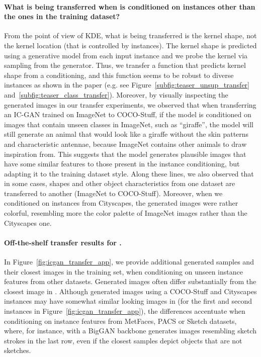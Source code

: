 \paragraph{What is being transferred when \ours is conditioned on instances other than the ones in the training dataset?} From the point of view of KDE, what is being transferred is the kernel shape, not the kernel location (that is controlled by instances). The kernel shape is predicted using a generative model from each input instance and we probe the kernel via sampling from the generator. Thus, we transfer a function that predicts kernel shape from a conditioning, and this function seems to be robust to diverse instances as shown in the paper (e.g. see Figure~\ref{subfig:teaser_unsup_transfer} and~\ref{subfig:teaser_class_transfer}). 
Moreover, by visually inspecting the generated images in our transfer experiments, we observed that when transferring an IC-GAN trained on ImageNet to COCO-Stuff, if the model is conditioned on images that contain unseen classes in ImageNet, such as “giraffe”, the model will still generate an animal that would look like a giraffe without the skin patterns and characteristic antennae, because ImageNet contains other animals to draw inspiration from. This suggests that the model generates plausible images that have some similar features to those present in the instance conditioning, but adapting it to the training dataset style. Along these lines, we also observed that in some cases, shapes and other object characteristics from one dataset are transferred to another (ImageNet to COCO-Stuff). Moreover, when we conditioned on instances from Cityscapes, the generated images were rather colorful, resembling more the color palette of ImageNet images rather than the Cityscapes one. 

\paragraph{Off-the-shelf transfer results for \ours.} In Figure~\ref{fig:icgan_transfer_app}, we provide additional generated samples and their closest images in the \ImNet training set, when conditioning on unseen instance features from other datasets. 
Generated images often differ substantially from the closest image in \ImNet. Although generated images using a COCO-Stuff and Cityscapes instances may have somewhat similar looking images in \ImNet (for the first and second instances in Figure~\ref{fig:icgan_transfer_app}), the differences accentuate when conditioning on instance features from MetFaces, PACS or Sketch datasets, where, for instance, \ours with a BigGAN backbone generates images resembling sketch strokes in the last row, even if the closest \ImNet samples depict objects that are not sketches.

